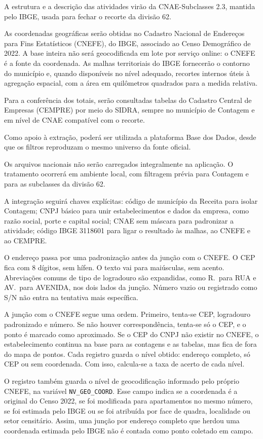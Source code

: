 A estrutura e a descrição das atividades virão da CNAE-Subclasses 2.3, mantida pelo IBGE, usada para fechar o recorte da divisão 62.

As coordenadas geográficas serão obtidas no Cadastro Nacional de Endereços para Fins Estatísticos (CNEFE), do IBGE, associado ao Censo Demográfico de 2022.
A base inteira não será geocodificada em lote por serviço online: o CNEFE é a fonte da coordenada.
As malhas territoriais do IBGE fornecerão o contorno do município e, quando disponíveis no nível adequado, recortes internos úteis à agregação espacial, com a área em quilômetros quadrados para a medida relativa.

Para a conferência dos totais, serão consultadas tabelas do Cadastro Central de Empresas (CEMPRE) por meio do SIDRA, sempre no município de Contagem e em nível de CNAE compatível com o recorte.

Como apoio à extração, poderá ser utilizada a plataforma Base dos Dados, desde que os filtros reproduzam o mesmo universo da fonte oficial.

Os arquivos nacionais não serão carregados integralmente na aplicação.
O tratamento ocorrerá em ambiente local, com filtragem prévia para Contagem e para as subclasses da divisão 62.

A integração seguirá chaves explícitas: código de município da Receita para isolar Contagem; CNPJ básico para unir estabelecimentos e dados da empresa, como razão social, porte e capital social; CNAE sem máscara para padronizar a atividade; código IBGE 3118601 para ligar o resultado às malhas, ao CNEFE e ao CEMPRE.

O endereço passa por uma padronização antes da junção com o CNEFE.
O CEP fica com 8 dígitos, sem hífen.
O texto vai para maiúsculas, sem acento.
Abreviações comuns de tipo de logradouro são expandidas, como R.\ para RUA e AV.\ para AVENIDA, nos dois lados da junção.
Número vazio ou registrado como S/N não entra na tentativa mais específica.

A junção com o CNEFE segue uma ordem.
Primeiro, tenta-se CEP, logradouro padronizado e número.
Se não houver correspondência, tenta-se só o CEP, e o ponto é marcado como aproximado.
Se o CEP do CNPJ não existir no CNEFE, o estabelecimento continua na base para as contagens e as tabelas, mas fica de fora do mapa de pontos.
Cada registro guarda o nível obtido: endereço completo, só CEP ou sem coordenada.
Com isso, calcula-se a taxa de acerto de cada nível.

O registro também guarda o nível de geocodificação informado pelo próprio CNEFE, na variável \texttt{NV\_GEO\_COORD}.
Esse campo indica se a coordenada é a original do Censo 2022, se foi modificada para apartamentos no mesmo número, se foi estimada pelo IBGE ou se foi atribuída por face de quadra, localidade ou setor censitário.
Assim, uma junção por endereço completo que herdou uma coordenada estimada pelo IBGE não é contada como ponto coletado em campo.

